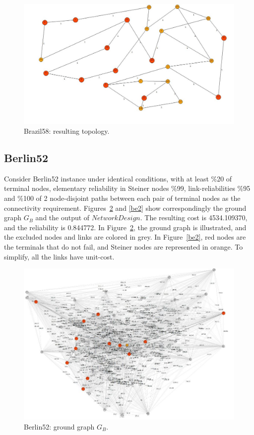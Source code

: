 \begin{figure}
\begin{center}
\includegraphics[scale=0.5]{2.jpg}
\caption{Brazil58: resulting topology.}\label{br2}
\end{center} 
\end{figure}


\subsection*{Berlin52}
Consider Berlin52 instance under identical conditions, with at least \%20 of terminal nodes, elementary reliability in Steiner nodes \%99, link-reliabilities \%95 and \%100 of 2 node-disjoint paths between each pair 
of terminal nodes as the connectivity requirement. Figures~\ref{be1} and \ref{be2} show correspondingly 
the ground graph $G_B$ and the output of $NetworkDesign$. The resulting cost is 4534.109370, and the 
reliability is 0.844772. In Figure~\ref{be1}, the ground graph is illustrated, and the excluded nodes and links are colored in grey. In Figure~\ref{be2}, red nodes are the terminals that do not fail, and 
Steiner nodes are represented in orange. To simplify, all the links have unit-cost.  

\begin{figure}[H]
\begin{center}
\includegraphics[scale=0.6]{3.jpg}
\caption{Berlin52: ground graph $G_B$.}\label{be1}
\end{center} 
\end{figure}

